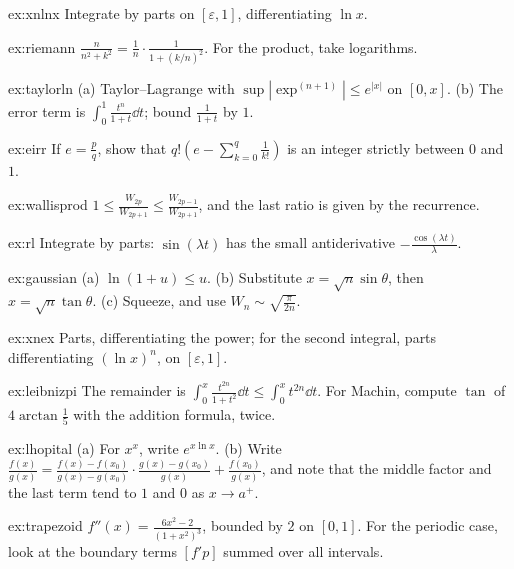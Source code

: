 \begin{hint}{ex:xnlnx}
Integrate by parts on $[\varepsilon,1]$, differentiating $\ln x$.
\end{hint}
\begin{hint}{ex:riemann}
$\frac n{n^2+k^2}=\frac1n\cdot\frac1{1+(k/n)^2}$. For the product, take logarithms.
\end{hint}
\begin{hint}{ex:taylorln}
(a) Taylor--Lagrange with $\sup|\exp^{(n+1)}|\le e^{|x|}$ on $[0,x]$. (b) The error term is $\int_0^1\frac{t^n}{1+t}\dd t$; bound $\frac1{1+t}$ by $1$.
\end{hint}
\begin{hint}{ex:eirr}
If $e=\frac pq$, show that $q!\left(e-\sum_{k=0}^q\frac1{k!}\right)$ is an integer strictly between $0$ and $1$.
\end{hint}
\begin{hint}{ex:wallisprod}
$1\le\frac{W_{2p}}{W_{2p+1}}\le\frac{W_{2p-1}}{W_{2p+1}}$, and the last ratio is given by the recurrence.
\end{hint}
\begin{hint}{ex:rl}
Integrate by parts: $\sin(\lambda t)$ has the small antiderivative $-\frac{\cos(\lambda t)}\lambda$.
\end{hint}
\begin{hint}{ex:gaussian}
(a) $\ln(1+u)\le u$. (b) Substitute $x=\sqrt n\sin\theta$, then $x=\sqrt n\tan\theta$. (c) Squeeze, and use $W_n\sim\sqrt{\frac\pi{2n}}$.
\end{hint}
\begin{hint}{ex:xnex}
Parts, differentiating the power; for the second integral, parts differentiating $(\ln x)^n$, on $[\varepsilon,1]$.
\end{hint}
\begin{hint}{ex:leibnizpi}
The remainder is $\int_0^x\frac{t^{2n}}{1+t^2}\dd t\le\int_0^xt^{2n}\dd t$. For Machin, compute $\tan$ of $4\arctan\frac15$ with the addition formula, twice.
\end{hint}
\begin{hint}{ex:lhopital}
(a) For $x^x$, write $e^{x\ln x}$. (b) Write $\frac{f(x)}{g(x)}=\frac{f(x)-f(x_0)}{g(x)-g(x_0)}\cdot\frac{g(x)-g(x_0)}{g(x)}+\frac{f(x_0)}{g(x)}$, and note that the middle factor and the last term tend to $1$ and $0$ as $x\to a^+$.
\end{hint}
\begin{hint}{ex:trapezoid}
$f''(x)=\frac{6x^2-2}{(1+x^2)^3}$, bounded by $2$ on $[0,1]$. For the periodic case, look at the boundary terms $[f'p]$ summed over all intervals.
\end{hint}
